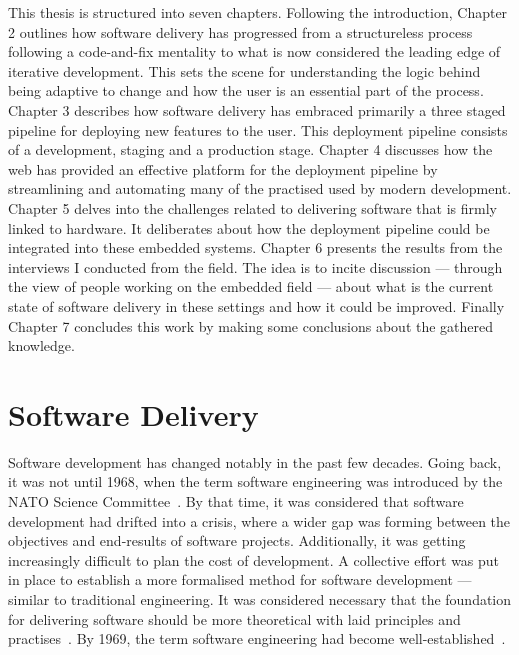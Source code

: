 \documentclass[english]{tktltiki2}
\begin{document}
This thesis is structured into seven chapters. Following the introduction, Chapter 2 outlines how software delivery has progressed from a structureless process following a code-and-fix mentality to what is now considered the leading edge of iterative development. This sets the scene for understanding the logic behind being adaptive to change and how the user is an essential part of the process. Chapter 3 describes how software delivery has embraced primarily a three staged pipeline for deploying new features to the user. This deployment pipeline consists of a development, staging and a production stage. Chapter 4 discusses how the web has provided an effective platform for the deployment pipeline by streamlining and automating many of the practised used by modern development. Chapter 5 delves into the challenges related to delivering software that is firmly linked to hardware. It deliberates about how the deployment pipeline could be integrated into these embedded systems. Chapter 6 presents the results from the interviews I conducted from the field. The idea is to incite discussion — through the view of people working on the embedded field — about what is the current state of software delivery in these settings and how it could be improved. Finally Chapter 7 concludes this work by making some conclusions about the gathered knowledge.


\section{Software Delivery}

Software development has changed notably in the past few decades. Going back, it was not until 1968, when the term software engineering was introduced by the NATO Science Committee~\cite{NR69}. By that time, it was considered that software development had drifted into a crisis, where a wider gap was forming between the objectives and end-results of software projects. Additionally, it was getting increasingly difficult to plan the cost of development. A collective effort was put in place to establish a more formalised method for software development — similar to traditional engineering. It was considered necessary that the foundation for delivering software should be more theoretical with laid principles and practises~\cite{NR69}. By 1969, the term software engineering had become well-established~\cite{BR70}.
\end{document}
